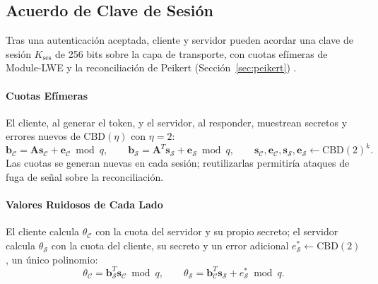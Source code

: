 \subsection{Acuerdo de Clave de Sesión}
\label{sec:pqlite-clave}

Tras una autenticación aceptada, cliente y servidor pueden acordar una clave de sesión $K_{\text{ses}}$ de 256 bits sobre la capa de transporte, con cuotas efímeras de Module-LWE y la reconciliación de Peikert (Sección~\ref{sec:peikert}) \cite{yang2025multiserver, peikert2014lattice}.

\paragraph{Cuotas Efímeras}
El cliente, al generar el token, y el servidor, al responder, muestrean secretos y errores nuevos de $\mathrm{CBD}(\eta)$ con $\eta = 2$:
\begin{equation}
\mathbf{b}_{\mathcal{C}} = \mathbf{A}\mathbf{s}_{\mathcal{C}} + \mathbf{e}_{\mathcal{C}} \bmod q, \qquad
\mathbf{b}_{\mathcal{S}} = \mathbf{A}^{T}\mathbf{s}_{\mathcal{S}} + \mathbf{e}_{\mathcal{S}} \bmod q,
\qquad \mathbf{s}_{\mathcal{C}}, \mathbf{e}_{\mathcal{C}}, \mathbf{s}_{\mathcal{S}}, \mathbf{e}_{\mathcal{S}} \leftarrow \mathrm{CBD}(2)^{k}.
\end{equation}
Las cuotas se generan nuevas en cada sesión; reutilizarlas permitiría ataques de fuga de señal sobre la reconciliación.

\paragraph{Valores Ruidosos de Cada Lado}
El cliente calcula $\theta_{\mathcal{C}}$ con la cuota del servidor y su propio secreto; el servidor calcula $\theta_{\mathcal{S}}$ con la cuota del cliente, su secreto y un error adicional $e^{\ast}_{\mathcal{S}} \leftarrow \mathrm{CBD}(2)$, un único polinomio:
\begin{equation}
\theta_{\mathcal{C}} = \mathbf{b}_{\mathcal{S}}^{T}\mathbf{s}_{\mathcal{C}} \bmod q, \qquad
\theta_{\mathcal{S}} = \mathbf{b}_{\mathcal{C}}^{T}\mathbf{s}_{\mathcal{S}} + e^{\ast}_{\mathcal{S}} \bmod q .
\end{equation}

